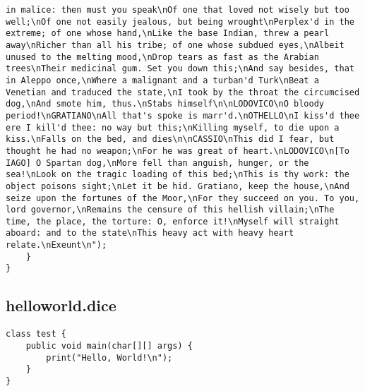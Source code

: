 \begin{verbatim}
in malice: then must you speak\nOf one that loved not wisely but too well;\nOf one not easily jealous, but being wrought\nPerplex'd in the extreme; of one whose hand,\nLike the base Indian, threw a pearl away\nRicher than all his tribe; of one whose subdued eyes,\nAlbeit unused to the melting mood,\nDrop tears as fast as the Arabian trees\nTheir medicinal gum. Set you down this;\nAnd say besides, that in Aleppo once,\nWhere a malignant and a turban'd Turk\nBeat a Venetian and traduced the state,\nI took by the throat the circumcised dog,\nAnd smote him, thus.\nStabs himself\n\nLODOVICO\nO bloody period!\nGRATIANO\nAll that's spoke is marr'd.\nOTHELLO\nI kiss'd thee ere I kill'd thee: no way but this;\nKilling myself, to die upon a kiss.\nFalls on the bed, and dies\n\nCASSIO\nThis did I fear, but thought he had no weapon;\nFor he was great of heart.\nLODOVICO\n[To IAGO] O Spartan dog,\nMore fell than anguish, hunger, or the sea!\nLook on the tragic loading of this bed;\nThis is thy work: the object poisons sight;\nLet it be hid. Gratiano, keep the house,\nAnd seize upon the fortunes of the Moor,\nFor they succeed on you. To you, lord governor,\nRemains the censure of this hellish villain;\nThe time, the place, the torture: O, enforce it!\nMyself will straight aboard: and to the state\nThis heavy act with heavy heart relate.\nExeunt\n");
	}
}

\end{verbatim}
\pagebreak
\subsection{helloworld.dice}
\begin{verbatim}
class test {
	public void main(char[][] args) {
		print("Hello, World!\n");
	}
}

\end{verbatim}
\pagebreak
